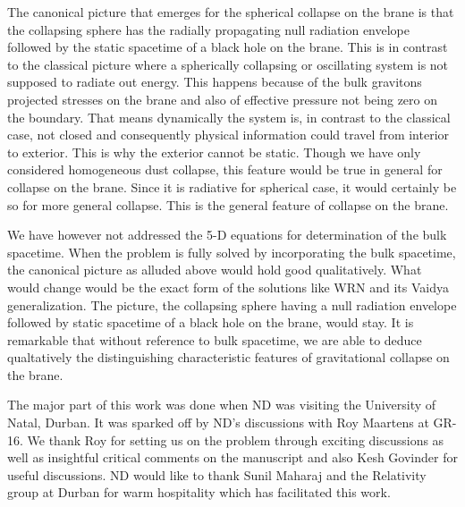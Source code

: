 \documentclass[a4paper,twocolumn,showpacs,preprintnumbers,amsmath,amssymb]{revtex4}
\begin{document}
The canonical picture that emerges for the spherical collapse on the brane 
is that the collapsing sphere has the radially propagating null radiation
envelope followed by the static spacetime of a black hole on the brane. This 
is in contrast to the classical picture where a spherically collapsing or 
oscillating system is not supposed to radiate out energy. This happens 
because of the bulk gravitons projected stresses on the brane and also of  
effective pressure not being zero on the boundary. That means dynamically the 
system is, in contrast to the classical case, not closed and consequently 
physical information could travel from interior to exterior. This is why the 
exterior cannot be static. Though we have only considered homogeneous dust 
collapse, this feature would be true in general for collapse on the brane.
Since it is radiative for spherical case, it would certainly be so for more 
general collapse. This is the general feature of collapse on the brane. 

We have however not addressed the 5-D equations for determination of  
the bulk spacetime. When the problem is fully solved by incorporating the 
bulk spacetime, the canonical picture as alluded above would hold good 
qualitatively. What would change would be the exact form of the solutions like 
WRN and its Vaidya generalization. The picture, the collapsing sphere having 
a null radiation envelope followed by static spacetime of a black hole on the 
brane, would stay. It is remarkable that without reference to bulk spacetime, 
we are able to deduce qualtatively the distinguishing characteristic features 
of gravitational collapse on the brane.


\begin{acknowledgments}

The major part of this work was done when ND was visiting the 
University of Natal, Durban. It was sparked off by ND's 
discussions with Roy Maartens at GR-16.
We thank Roy for setting us on the problem through exciting 
discussions as well as insightful critical comments on the manuscript and 
also Kesh Govinder for useful discussions. ND would like to thank Sunil 
Maharaj and the Relativity group at Durban for warm hospitality which has 
facilitated this work.

\end{acknowledgments}
\end{document}
